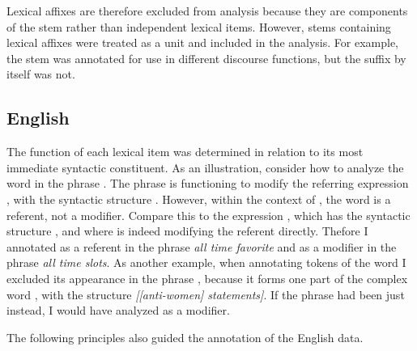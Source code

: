 \noindent Lexical affixes are therefore excluded from analysis because they are components of the stem rather than independent lexical items. However, stems containing lexical affixes were treated as a unit and included in the analysis. For example, the stem   was annotated for use in different discourse functions, but the suffix   by itself was not.

\subsection{English}
\label{sec:3.3.2}

The function of each lexical item was determined in relation to its most immediate syntactic constituent. As an illustration, consider how to analyze the word  in the phrase . The phrase  is functioning to modify the referring expression , with the syntactic structure . However, within the context of , the word  is a referent, not a modifier. Compare this to the expression , which has the syntactic structure , and where  is indeed modifying the referent  directly. Thefore I annotated  as a referent in the phrase \textit{all time favorite} and as a modifier in the phrase \textit{all time slots}. As another example, when annotating tokens of the word  I excluded its appearance in the phrase , because it forms one part of the complex word , with the structure \textit{[[anti-women] statements]}. If the phrase had been just  instead, I would have analyzed  as a modifier.

The following principles also guided the annotation of the English data.

